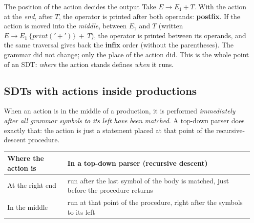 \documentclass[11pt,a4paper]{article}
\newcommand{\tok}[1]{\ensuremath{\mathtt{#1}}}
\begin{document}
\begin{notebox}{The position of the action decides the output}
Take $E\to E_1 + T$. With the action at the \emph{end}, after $T$, the operator is printed after both operands: \textbf{postfix}. If the action is moved into the \emph{middle}, between $E_1$ and $T$ (written $E\to E_1\ \{\mathit{print}(\tok{'+'})\}\ +\ T$), the operator is printed between its operands, and the same traversal gives back the \textbf{infix} order (without the parentheses). The grammar did not change; only the place of the action did. This is the whole point of an SDT: \emph{where} the action stands defines \emph{when} it runs.
\end{notebox}

\subsection{SDTs with actions inside productions}
When an action is in the middle of a production, it is performed \emph{immediately after all grammar symbols to its left have been matched}. A top-down parser does exactly that: the action is just a statement placed at that point of the recursive-descent procedure.

\begin{center}
\small
\begin{tabular}{@{}L{4.2cm} L{9.6cm}@{}}
\toprule
\textbf{Where the action is} & \textbf{In a top-down parser (recursive descent)} \\ \midrule
At the right end & run after the last symbol of the body is matched, just before the procedure returns \\
In the middle & run at that point of the procedure, right after the symbols to its left \\ \bottomrule
\end{tabular}
\end{center}
\end{document}

